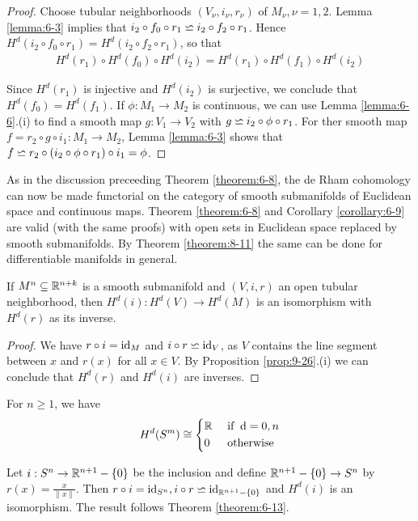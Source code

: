 \begin{proof}
  Choose tubular neighborhoods $(V_\nu, i_\nu, r_\nu)$ of $M_\nu, \nu=1, 2$. Lemma \ref{lemma:6-3}
  implies that $i_2\circ f_0\circ r_1 \backsimeq i_2\circ f_2\circ r_1$. Hence 
  $H^d(i_2\circ f_0\circ r_1) = H^d(i_2\circ f_2\circ r_1)$, so that 
  \begin{align*}
    H^d(r_1)\circ H^d(f_0)\circ H^d(i_2) 
    = H^d(r_1)\circ H^d(f_1)\circ H^d(i_2) 
  \end{align*}

  Since $H^d(r_1)$ is injective and $H^d(i_2)$ is surjective, we conclude that $H^d(f_0)
  = H^d(f_1)$. If $\phi:M_1\to M_2$ is continuous, we can use Lemma \ref{lemma:6-6}.(i) to find 
  a smooth map $g:V_1\to V_2$ with $g\backsimeq i_2\circ \phi\circ r_1$. For ther smooth map $f = r_2\circ g\circ i_1:M_1\to M_2$,
  Lemma \ref{lemma:6-3} shows that $f\backsimeq r_2\circ (i_2\circ \phi\circ r_1)\circ i_1 = \phi$. 
\end{proof}

\begin{remark}\label{remark:9-27}
  As in the discussion preceeding Theorem \ref{theorem:6-8}, the de Rham cohomology 
  can now be made functorial on the category of smooth submanifolds of
  Euclidean space and continuous maps. Theorem \ref{theorem:6-8} and Corollary \ref{corollary:6-9} 
  are valid (with the same proofs) with open sets in Euclidean space replaced by smooth submanifolds. 
  By Theorem \ref{theorem:8-11} the same can be done for differentiable manifolds in general.
\end{remark}

\begin{corollary}\label{corollary:9-28}
  If $M^n\subseteq {\ensuremath{\mathbb{R}}}^{n+k}$ is a smooth submanifold and $(V, i, r)$ an open tubular neighborhood, then 
  $H^d(i):H^d(V)\to H^d(M)$ is an isomorphism with $H^d(r)$ as its inverse.
\end{corollary}

\begin{proof}
  We have $r\circ i = \operatorname{id}_M$ and $i\circ r \backsimeq \operatorname{id}_V$, as $V$ contains the line segment
between $x$ and $r(x)$ for all $x\in V$. By Proposition \ref{prop:9-26}.(i) we can conclude
that $H^d(r)$ and $H^d(i)$ are inverses.
\end{proof}

\begin{example}\label{example:9-29}
  For $n\ge 1$, we have 
  \begin{align*}
    H^d(S^m)\simee \left\{\begin{aligned}
      & \RR && \text{ if } \dd = 0, n \\
      & 0 && \text{ otherwise }
    \end{aligned}\right.
  \end{align*}

  Let $i:S^n\to{\ensuremath{\mathbb{R}}}^{n+1}-\{0\}$ be the inclusion and define ${\mathbb{R}}^{n+1}-\{0\}\to S^n$ by 
  $r(x) = \frac{x}{\|x\|}$. Then $r\circ i = \operatorname{id}_{S^n}, i\circ r \backsimeq \operatorname{id}_{{\mathbb{R}}^{n+1}-\{0\}}$ and 
  $H^d(i)$ is an isomorphism. The result follows Theorem \ref{theorem:6-13}.
\end{example}

